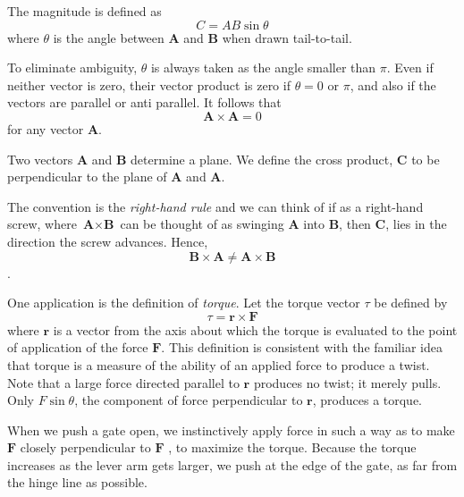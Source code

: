 \documentclass{article}
\begin{document}
{\begin{defi}
     The magnitude is defined as 
     \[C = AB\sin\theta\] where $\theta$ is the angle between $\textbf{A}$ and
     $\textbf{B}$ when drawn tail-to-tail.

     To eliminate ambiguity, $\theta$ is always taken as the angle smaller than
$\pi$. Even if neither vector is zero, their vector product is zero if $\theta =
0$ or $\pi$, and also if the vectors are parallel or anti parallel. It follows that
    \[\textbf{A} \times \textbf{A} = 0\]
    for any vector $\textbf{A}$.

    Two vectors $\textbf{A}$ and $\textbf{B}$ determine a plane. We define the
    cross product, $\textbf{C}$ to be perpendicular to the plane of $\textbf{A}$
    and $\textbf{A}$.

    The convention is the \emph{right-hand rule} and we can think of if as a
    right-hand screw, where $\textbf{A} \times \textbf{B}$ can be thought of as
    swinging $\textbf{A}$ into $\textbf{B}$, then $\textbf{C}$, lies in the
    direction the screw advances. Hence, 
    \[\textbf{B} \times \textbf{A} \neq \textbf{A} \times \textbf{B}\].
\end{defi}

\begin{eg}
     One application is the definition of \emph{torque}. Let the torque vector
     $\tau$ be defined by
     \[\tau =\textbf{r} \times \textbf{F} \] where $\textbf{r}$ is a vector from
     the axis about which the torque is evaluated to the point of application of
     the force $\textbf{F}$. This definition is consistent with the familiar
     idea that torque is a measure of the ability of an applied force to produce
     a twist. Note that a large force directed parallel to $\textbf{r}$ produces
     no twist; it merely pulls. Only $F\sin\theta$, the component of force
     perpendicular to $\textbf{r}$, produces a torque.

     When we push a gate open, we instinctively apply force in such a way as to
make $\textbf{F}$ closely perpendicular to $\textbf{F}$ , to maximize the
torque. Because the torque increases as the lever arm gets larger, we push at
the edge of the gate, as far from the hinge line as possible.
\end{eg}
\newpage
}
\end{document}
